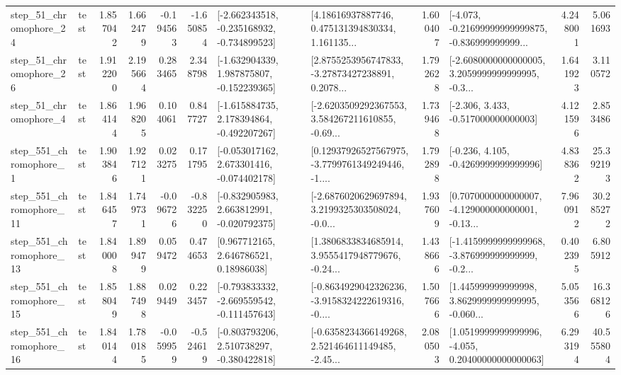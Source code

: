 \begin{tabular}{llrrrrllrlrr}
   step\_51\_chromophore\_24 &      test &      1.857042 &    1.662479 &     -0.194563 & -1.650854 &  [-2.662343518, -0.235168932, -0.734899523] &  [4.18616937887746, 0.475131394830334, 1.161135... &       1.600407 &  [-4.073, -0.21699999999999875, -0.836999999999... &            4.248001 &          5.061693 \\
   step\_51\_chromophore\_26 &      test &      1.912200 &    2.195664 &      0.283465 &  2.348798 &   [-1.632904339, 1.987875807, -0.152239365] &  [2.8755253956747833, -3.27873427238891, 0.2078... &       1.792628 &  [-2.6080000000000005, 3.2059999999999995, -0.3... &            1.641923 &          3.110572 \\
    step\_51\_chromophore\_4 &      test &      1.864144 &    1.968205 &      0.104061 &  0.847727 &   [-1.615884735, 2.178394864, -0.492207267] &  [-2.6203509292367553, 3.584267211610855, -0.69... &       1.739468 &                [-2.306, 3.433, -0.517000000000003] &            4.121596 &          2.853486 \\
   step\_551\_chromophore\_1 &      test &      1.903846 &    1.927121 &      0.023275 &  0.171795 &   [-0.053017162, 2.673301416, -0.074402178] &  [0.12937926527567975, -3.7799761349249446, -1.... &       1.792898 &               [-0.236, 4.105, -0.4269999999999996] &            4.838362 &         25.392193 \\
  step\_551\_chromophore\_11 &      test &      1.846457 &    1.749731 &     -0.096726 & -0.832250 &   [-0.832905983, 2.663812991, -0.020792375] &  [-2.6876020629697894, 3.2199325303508024, -0.0... &       1.937609 &  [0.7070000000000007, -4.129000000000001, -0.13... &            7.960912 &         30.285272 \\
  step\_551\_chromophore\_13 &      test &      1.840008 &    1.899479 &      0.059472 &  0.474653 &      [0.967712165, 2.646786521, 0.18986038] &  [1.3806833834685914, 3.9555417948779676, -0.24... &       1.438666 &  [-1.4159999999999968, -3.876999999999999, -0.2... &            0.402395 &          6.805912 \\
  step\_551\_chromophore\_15 &      test &      1.858049 &    1.887498 &      0.029449 &  0.223457 &  [-0.793833332, -2.669559542, -0.111457643] &  [-0.8634929042326236, -3.9158324222619316, -0.... &       1.507666 &  [1.445999999999998, 3.8629999999999995, -0.060... &            5.053566 &         16.368126 \\
  step\_551\_chromophore\_16 &      test &      1.840144 &    1.780185 &     -0.059959 & -0.524619 &   [-0.803793206, 2.510738297, -0.380422818] &  [-0.6358234366149268, 2.521464611149485, -2.45... &       2.080503 &  [1.0519999999999996, -4.055, 0.20400000000000063] &            6.293194 &         40.555804 \\

\end{tabular}
